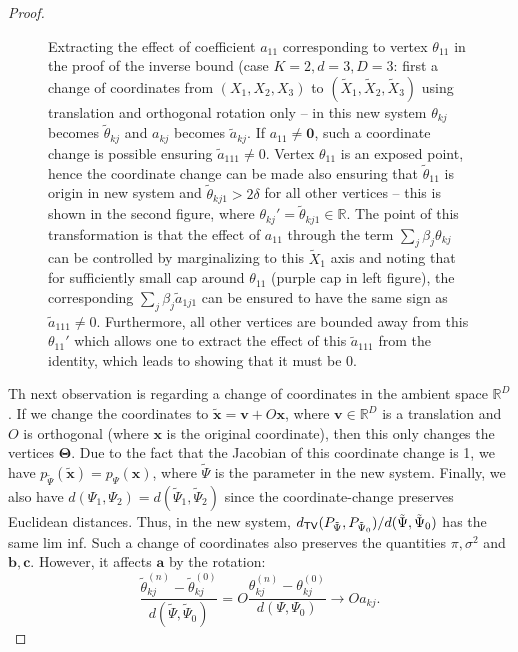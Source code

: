 \documentclass[bj,authoryear]{imsart}
\theoremstyle{plain}
\theoremstyle{remark}
\def\bTheta{{\boldsymbol\Theta}}
\def\ba{\mathbf{a}}
\def\bb{\mathbf{b}}
\def\bc{\mathbf{c}}
\def\bv{\mathbf{v}}
\def\bx{\mathbf{x}}
\def\bbR{\mathbb{R}}
\def\TV{{\sf TV}}
\def\bTheta{\boldsymbol{\Theta}}
\begin{document}
\begin{appendix}
\begin{proof}
\begin{figure}
    \caption{Extracting the effect of coefficient $a_{11}$ corresponding to vertex $\theta_{11}$ in the proof of the inverse bound (case $K=2, d=3, D=3$: first a change of coordinates from $(X_1,X_2,X_3)$ to $(\tilde{X}_1,\tilde{X}_2, \tilde{X}_3)$ using translation and orthogonal rotation only -- in this new system $\theta_{kj}$ becomes $\tilde{\theta}_{kj}$ and $a_{kj}$ becomes $\tilde{a}_{kj}$. If $a_{11}\neq\boldsymbol{0}$, such a coordinate change is possible ensuring $\tilde{a}_{111}\neq 0$. Vertex $\theta_{11}$ is an exposed point, hence the coordinate change can be made also ensuring that $\tilde{\theta}_{11}$ is origin in new system and $\tilde{\theta}_{kj1}>2\delta$ for all other vertices -- this is shown in the second figure, where $\theta_{kj}'=\tilde{\theta}_{kj1}\in\bbR$. The point of this transformation is that the effect of $a_{11}$ through the term $\sum_j \beta_j\theta_{kj}$ can be controlled by marginalizing to this $\tilde{X}_1$ axis and noting that for sufficiently small cap around $\theta_{11}$ (purple cap in left figure), the corresponding $\sum_j \beta_j \tilde{a}_{1j1}$ can be ensured to have the same sign as $\tilde{a}_{111}\neq 0$. Furthermore, all other vertices are bounded away from this $\theta_{11}'$ which allows one to extract the effect of this $\tilde{a}_{111}$ from the identity, which leads to showing that it must be 0.}
    \label{fig:enter-label}
\end{figure}
    Th next observation is regarding a change of coordinates in the ambient space $\bbR^D$. If we change the coordinates to $\tilde{\bx} = \bv + O\bx$, where $\bv\in\bbR^D$ is a translation and $O$ is orthogonal (where $\bx$ is the original coordinate), then this only changes the vertices $\bTheta$. Due to the fact that the Jacobian of this coordinate change is 1, we have $p_{\tilde{\Psi}}(\tilde{\bx}) = p_{\Psi}(\bx)$, where $\tilde{\Psi}$ is the parameter in the new system. Finally, we also have $d(\Psi_1, \Psi_2) = d(\tilde{\Psi}_1, \tilde{\Psi}_2)$ since the coordinate-change preserves Euclidean distances. Thus, in the new system, $d_{\TV}(P_{\tilde{\Psi}}, P_{\tilde{\Psi}_0})/d(\tilde{\Psi}, \tilde{\Psi}_0)$ has the same lim inf. Such a change of coordinates also preserves the quantities $\pi, \sigma^2$ and $\bb, \bc$. However, it affects $\ba$ by the rotation:
    $$\frac{\tilde{\theta}_{kj}^{(n)} - \tilde{\theta}_{kj}^{(0)}}{d(\tilde{\Psi}, \tilde{\Psi}_0)} = O \frac{\theta_{kj}^{(n)}-\theta_{kj}^{(0)}}{d(\Psi, \Psi_0)} \to O a_{kj}.$$

\end{proof}
\end{appendix}
\end{document}
